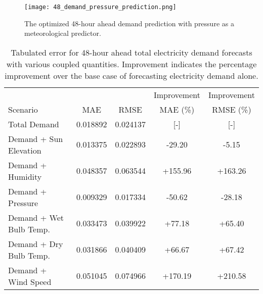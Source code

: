 \begin{figure*}[ht]
  \centering
  \texttt{[image: 48\_demand\_pressure\_prediction.png]}
  \caption{The optimized 48-hour ahead demand prediction with pressure as a  meteorological
  predictor.}
  \label{fig:48demand}
\end{figure*}

  \begin{table*}[ht]
    \centering
    \caption{Tabulated error for 48-hour ahead total electricity demand forecasts with various coupled quantities. Improvement indicates the percentage improvement over the base case of forecasting electricity demand alone.}
    \label{tab:demand48}
    \begin{tabular}{l|c|c|c|c}
      &  & & Improvement & Improvement \\
      Scenario  & MAE & RMSE & MAE (\%) & RMSE (\%)\\
      \hline
      Total Demand & 0.018892 & 0.024137 & [-] & [-] \\
      Demand + Sun Elevation & 0.013375 & 0.022893 & -29.20& -5.15 \\
      Demand + Humidity & 0.048357 & 0.063544 & +155.96 & +163.26 \\
      Demand + Pressure & 0.009329 & 0.017334 & -50.62 & -28.18\\
      Demand + Wet Bulb Temp. & 0.033473 & 0.039922 & +77.18 & +65.40\\
      Demand + Dry Bulb Temp. & 0.031866 & 0.040409 & +66.67 & +67.42\\
      Demand + Wind Speed & 0.051045 & 0.074966 & +170.19 & +210.58\\
    \end{tabular}
  \end{table*}
